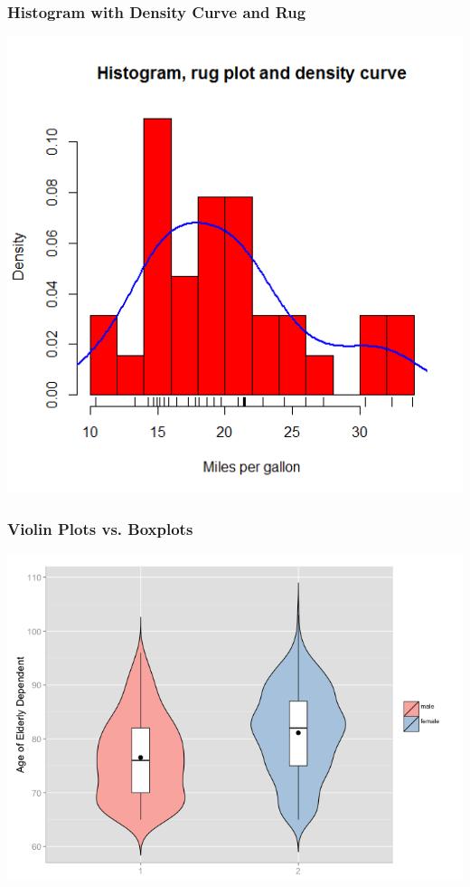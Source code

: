 \documentclass{beamer} %
\begin{document}
\begin{frame}\frametitle{Histogram with Density Curve and Rug}
	\centering
	\includegraphics[width=0.8\linewidth]{hist-rug-dens.png}
\end{frame}





\begin{frame}\frametitle{Violin Plots vs. Boxplots}
	\centering
	\includegraphics[width=\linewidth]{violin.png}
\end{frame}
\end{document}
